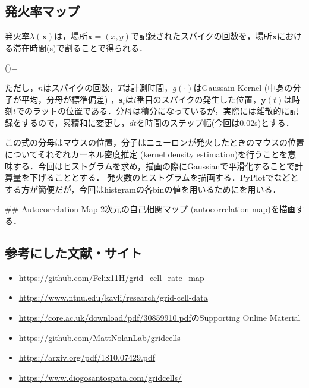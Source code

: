\subsection{発火率マップ}

発火率$\lambda(\boldsymbol{x})$は，場所$\boldsymbol{x}=(x,y)$で記録されたスパイクの回数を，場所$\boldsymbol{x}$における滞在時間(s)で割ることで得られる． 

 
\lambda()= 
 

ただし，$n$はスパイクの回数，$T$は計測時間，$g(\cdot)$はGaussain
Kernel (中身の分子が平均，分母が標準偏差) ，$\boldsymbol{s}_i$は$i$番目のスパイクの発生した位置，$\boldsymbol{y}(t)$は時刻$t$でのラットの位置である．分母は積分になっているが，実際には離散的に記録をするので，累積和に変更し，$dt$を時間のステップ幅(今回は0.02s)とする．

この式の分母はマウスの位置，分子はニューロンが発火したときのマウスの位置についてそれぞれカーネル密度推定 (kernel density estimation)を行うことを意味する．今回はヒストグラムを求め，描画の際にGaussianで平滑化することで計算量を下げることとする．
発火数のヒストグラムを描画する．PyPlotでなどとする方が簡便だが，今回はhistgramの各binの値を用いるためにを用いる．



## Autocorrelation Map
2次元の自己相関マップ (autocorrelation map)を描画する．




\subsection{参考にした文献・サイト}
\begin{itemize}
\item \url{https://github.com/Felix11H/grid_cell_rate_map}
\item \url{https://www.ntnu.edu/kavli/research/grid-cell-data}
\item \url{https://core.ac.uk/download/pdf/30859910.pdf}のSupporting Online Material
\item \url{https://github.com/MattNolanLab/gridcells}
\item \url{https://arxiv.org/pdf/1810.07429.pdf}
\item \url{https://www.diogosantospata.com/gridcells/}
\end{itemize}
